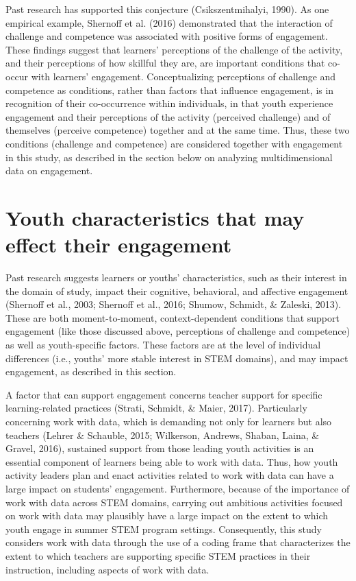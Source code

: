 \documentclass[]{msu-thesis}
\theoremstyle{definition}
\theoremstyle{definition}
\theoremstyle{definition}
\theoremstyle{remark}
\begin{document}
Past research has supported this conjecture (Csikszentmihalyi, 1990). As
one empirical example, Shernoff et al. (2016) demonstrated that the
interaction of challenge and competence was associated with positive
forms of engagement. These findings suggest that learners' perceptions
of the challenge of the activity, and their perceptions of how skillful
they are, are important conditions that co-occur with learners'
engagement. Conceptualizing perceptions of challenge and competence as
conditions, rather than factors that influence engagement, is in
recognition of their co-occurrence within individuals, in that youth
experience engagement and their perceptions of the activity (perceived
challenge) and of themselves (perceive competence) together and at the
same time. Thus, these two conditions (challenge and competence) are
considered together with engagement in this study, as described in the
section below on analyzing multidimensional data on engagement.

\section{Youth characteristics that may effect their
engagement}\label{youth-characteristics-that-may-effect-their-engagement}

Past research suggests learners or youths' characteristics, such as
their interest in the domain of study, impact their cognitive,
behavioral, and affective engagement (Shernoff et al., 2003; Shernoff et
al., 2016; Shumow, Schmidt, \& Zaleski, 2013). These are both
moment-to-moment, context-dependent conditions that support engagement
(like those discussed above, perceptions of challenge and competence) as
well as youth-specific factors. These factors are at the level of
individual differences (i.e., youths' more stable interest in STEM
domains), and may impact engagement, as described in this section.

A factor that can support engagement concerns teacher support for
specific learning-related practices (Strati, Schmidt, \& Maier, 2017).
Particularly concerning work with data, which is demanding not only for
learners but also teachers (Lehrer \& Schauble, 2015; Wilkerson,
Andrews, Shaban, Laina, \& Gravel, 2016), sustained support from those
leading youth activities is an essential component of learners being
able to work with data. Thus, how youth activity leaders plan and enact
activities related to work with data can have a large impact on
students' engagement. Furthermore, because of the importance of work
with data across STEM domains, carrying out ambitious activities focused
on work with data may plausibly have a large impact on the extent to
which youth engage in summer STEM program settings. Consequently, this
study considers work with data through the use of a coding frame that
characterizes the extent to which teachers are supporting specific STEM
practices in their instruction, including aspects of work with data.
\end{document}
